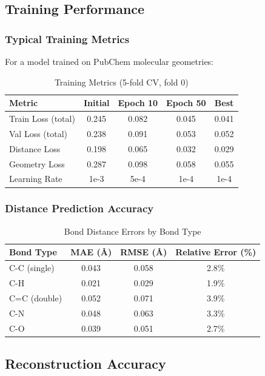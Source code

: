 \documentclass[11pt,a4paper]{article}
\begin{document}
\subsection{Training Performance}

\subsubsection{Typical Training Metrics}

For a model trained on PubChem molecular geometries:

\begin{table}[h]
\centering
\caption{Training Metrics (5-fold CV, fold 0)}
\begin{tabular}{lcccc}
\toprule
Metric & Initial & Epoch 10 & Epoch 50 & Best \\
\midrule
Train Loss (total) & 0.245 & 0.082 & 0.045 & 0.041 \\
Val Loss (total) & 0.238 & 0.091 & 0.053 & 0.052 \\
Distance Loss & 0.198 & 0.065 & 0.032 & 0.029 \\
Geometry Loss & 0.287 & 0.098 & 0.058 & 0.055 \\
Learning Rate & 1e-3 & 5e-4 & 1e-4 & 1e-4 \\
\bottomrule
\end{tabular}
\end{table}

\subsubsection{Distance Prediction Accuracy}

\begin{table}[h]
\centering
\caption{Bond Distance Errors by Bond Type}
\begin{tabular}{lccc}
\toprule
Bond Type & MAE (Å) & RMSE (Å) & Relative Error (\%) \\
\midrule
C-C (single) & 0.043 & 0.058 & 2.8\% \\
C-H & 0.021 & 0.029 & 1.9\% \\
C=C (double) & 0.052 & 0.071 & 3.9\% \\
C-N & 0.048 & 0.063 & 3.3\% \\
C-O & 0.039 & 0.051 & 2.7\% \\
\bottomrule
\end{tabular}
\end{table}

\subsection{Reconstruction Accuracy}
\end{document}
